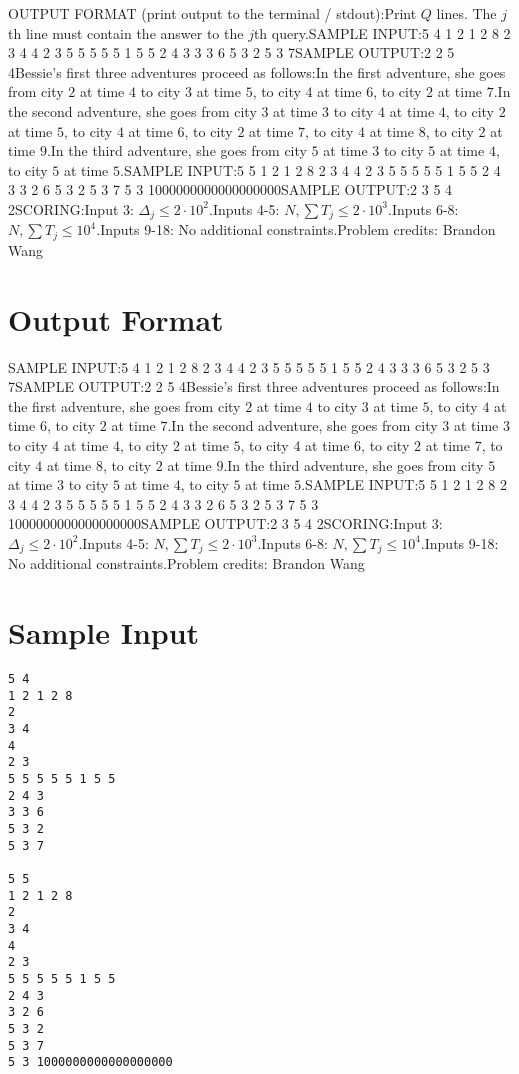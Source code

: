 \documentclass[12pt]{article}
\begin{document}
OUTPUT FORMAT (print output to the terminal / stdout):Print $Q$ lines. The $j$th line must contain the answer to the $j$th query.SAMPLE INPUT:5 4
1 2 1 2 8
2
3 4
4
2 3
5 5 5 5 5 1 5 5
2 4 3
3 3 6
5 3 2
5 3 7SAMPLE OUTPUT:2
2
5
4Bessie's first three adventures proceed as follows:In the first adventure, she goes from city $2$ at time $4$ to city $3$ at time $5$, to city $4$ at time $6$, to city $2$ at time $7$.In the second adventure, she goes from city $3$ at time $3$ to city $4$ at time $4$, to city $2$ at time $5$, to city $4 $ at time $6$, to city $2$ at time $7$, to city $4$ at time $8$, to city $2$ at time $9$.In the third adventure, she goes from city $5$ at time $3$ to city $5$ at time $4$, to city $5$ at time $5$.SAMPLE INPUT:5 5
1 2 1 2 8
2
3 4
4
2 3
5 5 5 5 5 1 5 5
2 4 3
3 2 6
5 3 2
5 3 7
5 3 1000000000000000000SAMPLE OUTPUT:2
3
5
4
2SCORING:Input 3: $\Delta_j \leq 2\cdot 10^2$.Inputs 4-5: $N, \sum T_j\leq 2\cdot 10^3$.Inputs 6-8: $N, \sum T_j\leq 10^4$.Inputs 9-18: No additional constraints.Problem credits: Brandon Wang

\section*{Output Format}
SAMPLE INPUT:5 4
1 2 1 2 8
2
3 4
4
2 3
5 5 5 5 5 1 5 5
2 4 3
3 3 6
5 3 2
5 3 7SAMPLE OUTPUT:2
2
5
4Bessie's first three adventures proceed as follows:In the first adventure, she goes from city $2$ at time $4$ to city $3$ at time $5$, to city $4$ at time $6$, to city $2$ at time $7$.In the second adventure, she goes from city $3$ at time $3$ to city $4$ at time $4$, to city $2$ at time $5$, to city $4 $ at time $6$, to city $2$ at time $7$, to city $4$ at time $8$, to city $2$ at time $9$.In the third adventure, she goes from city $5$ at time $3$ to city $5$ at time $4$, to city $5$ at time $5$.SAMPLE INPUT:5 5
1 2 1 2 8
2
3 4
4
2 3
5 5 5 5 5 1 5 5
2 4 3
3 2 6
5 3 2
5 3 7
5 3 1000000000000000000SAMPLE OUTPUT:2
3
5
4
2SCORING:Input 3: $\Delta_j \leq 2\cdot 10^2$.Inputs 4-5: $N, \sum T_j\leq 2\cdot 10^3$.Inputs 6-8: $N, \sum T_j\leq 10^4$.Inputs 9-18: No additional constraints.Problem credits: Brandon Wang

\section*{Sample Input}
\begin{verbatim}
5 4
1 2 1 2 8
2
3 4
4
2 3
5 5 5 5 5 1 5 5
2 4 3
3 3 6
5 3 2
5 3 7

5 5
1 2 1 2 8
2
3 4
4
2 3
5 5 5 5 5 1 5 5
2 4 3
3 2 6
5 3 2
5 3 7
5 3 1000000000000000000
\end{verbatim}
\end{document}
